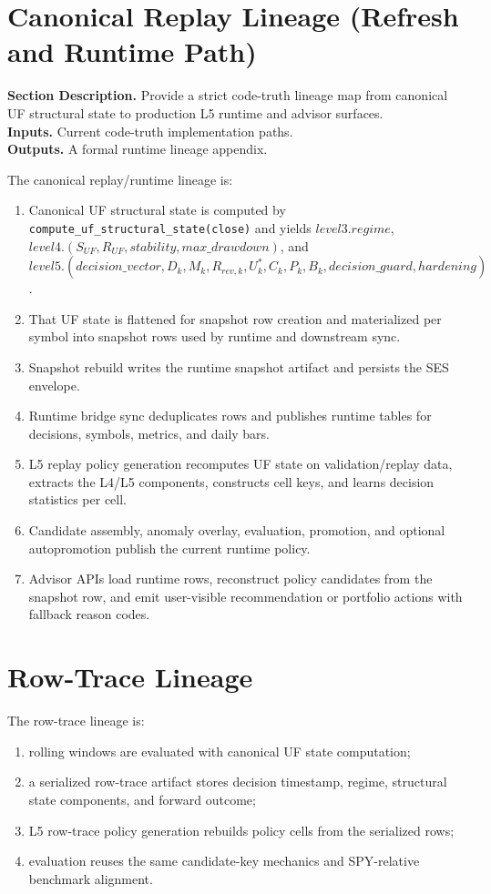 \documentclass[11pt]{report}
\newcommand{\meta}[3]{\textbf{Section Description.} #1\\
\textbf{Inputs.} #2\\
\textbf{Outputs.} #3\par}
\begin{document}
\section{Canonical Replay Lineage (Refresh and Runtime Path)}
\meta{Provide a strict code-truth lineage map from canonical UF structural state to production L5 runtime and advisor surfaces.}{Current code-truth implementation paths.}{A formal runtime lineage appendix.}

The canonical replay/runtime lineage is:
\begin{enumerate}[leftmargin=1.2cm]
    \item Canonical UF structural state is computed by \texttt{compute\_uf\_structural\_state(close)} and yields $level3.regime$, $level4.(S_{UF},R_{UF},stability,max\_drawdown)$, and $level5.(decision\_vector,D_k,M_k,R_{rev,k},U_k^{\ast},C_k,P_k,B_k,decision\_guard,hardening)$.
    \item That UF state is flattened for snapshot row creation and materialized per symbol into snapshot rows used by runtime and downstream sync.
    \item Snapshot rebuild writes the runtime snapshot artifact and persists the SES envelope.
    \item Runtime bridge sync deduplicates rows and publishes runtime tables for decisions, symbols, metrics, and daily bars.
    \item L5 replay policy generation recomputes UF state on validation/replay data, extracts the L4/L5 components, constructs cell keys, and learns decision statistics per cell.
    \item Candidate assembly, anomaly overlay, evaluation, promotion, and optional autopromotion publish the current runtime policy.
    \item Advisor APIs load runtime rows, reconstruct policy candidates from the snapshot row, and emit user-visible recommendation or portfolio actions with fallback reason codes.
\end{enumerate}

\section{Row-Trace Lineage}
The row-trace lineage is:
\begin{enumerate}[leftmargin=1.2cm]
    \item rolling windows are evaluated with canonical UF state computation;
    \item a serialized row-trace artifact stores decision timestamp, regime, structural state components, and forward outcome;
    \item L5 row-trace policy generation rebuilds policy cells from the serialized rows;
    \item evaluation reuses the same candidate-key mechanics and SPY-relative benchmark alignment.
\end{enumerate}
\end{document}
